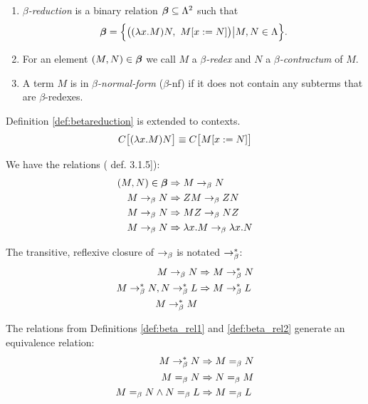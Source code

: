 \begin{definition}\label{def:betareduction}\mbox{}
	\begin{enumerate}
		\item \emph{$\beta$-reduction} is a binary relation $\boldsymbol\beta\subseteq\Lambda^2$ such that
		\begin{equation*}
			\BETA=\Big\{\big((\lam{x}{M})N,\ M[x:=N]\big)\big|M,N\in\Lambda\Big\}.
		\end{equation*}
		\item For an element $(M,N)\in\boldsymbol\beta$ we call $M$ a \emph{$\beta$-redex} and
		$N$ a \emph{$\beta$-contractum} of $M$.
		\item A term $M$ is in \emph{$\beta$-normal-form} ($\beta$-nf) if it 
		does not contain any subterms that are $\beta$-redexes.
	\end{enumerate}
\end{definition}
\begin{definition}
	Definition \ref{def:betareduction} is extended to contexts.
	\begin{align*}
		C\big[(\lambda x.M)N\big]\equiv C\big[M[x:=N]\big]
	\end{align*}
\end{definition}
\begin{definition}\label{def:beta_rel1}
	We have the relations (\cite{Barendregt} def. 3.1.5]):
	\begin{align*}
		(M,N)\in\boldsymbol\beta&\Rightarrow M\rightarrow_\beta N \\
		M\rightarrow_\beta N &\Rightarrow ZM\rightarrow_\beta ZN \\
		M\rightarrow_\beta N &\Rightarrow MZ\rightarrow_\beta NZ \\
		M\rightarrow_\beta N &\Rightarrow \lambda x.M\rightarrow_\beta \lambda x.N 
	\end{align*}	
\end{definition}
\begin{definition}\label{def:beta_rel2}
	The transitive, reflexive closure of $\rightarrow_\beta$ is notated $\rightarrow_\beta^*$:
	\begin{align*}
		M\rightarrow_\beta N &\Rightarrow M\rightarrow_\beta^* N \\
		M\rightarrow_\beta^* N, N\rightarrow_\beta^* L &\Rightarrow M\rightarrow_\beta^* L \\
		M\rightarrow_\beta^* M & 
	\end{align*}
\end{definition}
\begin{definition}
	The relations from Definitions \ref{def:beta_rel1} and \ref{def:beta_rel2} 
	generate an equivalence relation:
	\begin{align*}
		M\rightarrow_\beta^* N &\Rightarrow M=_\beta N \\
		M=_\beta N &\Rightarrow N=_\beta M \\
		M=_\beta N\wedge N=_\beta L&\Rightarrow M=_\beta L
	\end{align*}	
\end{definition}
